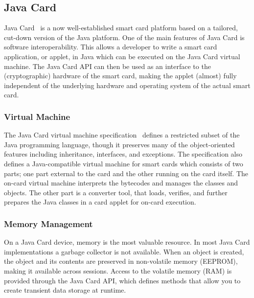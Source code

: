 \subsection{Java Card}\label{sec:javacard}

Java Card~\cite{Chen00} is a now well-established smart card platform based on
a tailored, cut-down version of the Java platform. One of the main features of
Java Card is software interoperability. This allows a developer to write a smart
card application, or applet, in Java which can be executed on the Java Card virtual machine.
The Java Card API can then be used as an interface to the
(cryptographic) hardware of the smart card, making the applet (almost) fully
independent of the underlying hardware and operating system of the actual smart
card.

\subsubsection{Virtual Machine}

The Java Card virtual machine
specification~\cite{jcvm222} defines a restricted subset of the Java programming
language, though it preserves many of the object-oriented features including
inheritance, interfaces, and exceptions. The specification also defines a
Java-compatible virtual machine for smart cards which consists of two parts; one
part external to the card and the other running on the card itself. The on-card
virtual machine interprets the bytecodes and manages the classes and objects.
The other part is a converter tool, that loads, verifies, and further prepares
the Java classes in a card applet for on-card execution.

\subsubsection{Memory Management}

On a Java Card device, memory is the most valuable resource. In most Java Card
implementations a garbage collector is not available. When an object is
created, the object and its contents are preserved in non-volatile memory
 (EEPROM), making it available across
sessions. Access to the volatile memory (RAM)
is provided through the Java Card API, which defines methods that allow you to
create transient data storage at runtime.

